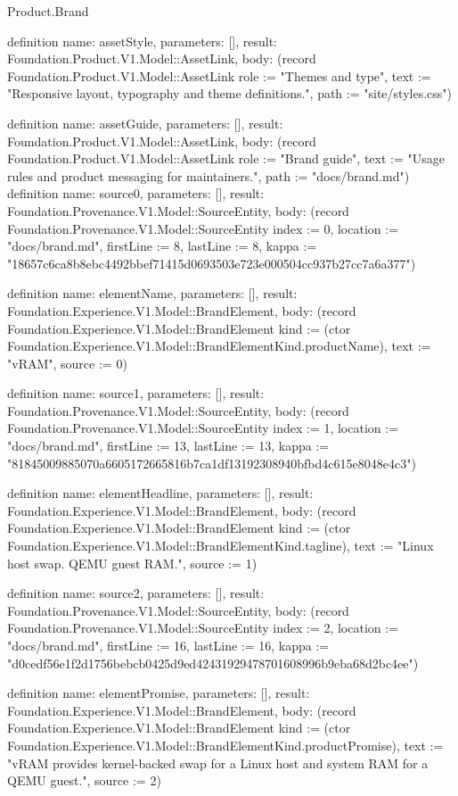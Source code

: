 \begin{lexlean}{Product.Brand}
\begin{semanticmodule}
definition{
  name: assetStyle, parameters: [], result: Foundation.Product.V1.Model::AssetLink,
  body: (record Foundation.Product.V1.Model::AssetLink {role := "Themes and type", text := "Responsive layout, typography and theme definitions.", path := "site/styles.css"})
}

definition{
  name: assetGuide, parameters: [], result: Foundation.Product.V1.Model::AssetLink,
  body: (record Foundation.Product.V1.Model::AssetLink {role := "Brand guide", text := "Usage rules and product messaging for maintainers.", path := "docs/brand.md"})
}
definition{
  name: source0, parameters: [], result: Foundation.Provenance.V1.Model::SourceEntity,
  body: (record Foundation.Provenance.V1.Model::SourceEntity {index := 0, location := "docs/brand.md", firstLine := 8, lastLine := 8, kappa := "18657c6ca8b8ebc4492bbef71415d0693503e723e000504cc937b27cc7a6a377"})
}

definition{
  name: elementName, parameters: [], result: Foundation.Experience.V1.Model::BrandElement,
  body: (record Foundation.Experience.V1.Model::BrandElement {kind := (ctor Foundation.Experience.V1.Model::BrandElementKind.productName), text := "vRAM", source := 0})
}

definition{
  name: source1, parameters: [], result: Foundation.Provenance.V1.Model::SourceEntity,
  body: (record Foundation.Provenance.V1.Model::SourceEntity {index := 1, location := "docs/brand.md", firstLine := 13, lastLine := 13, kappa := "81845009885070a6605172665816b7ca1df13192308940bfbd4c615e8048e4c3"})
}

definition{
  name: elementHeadline, parameters: [], result: Foundation.Experience.V1.Model::BrandElement,
  body: (record Foundation.Experience.V1.Model::BrandElement {kind := (ctor Foundation.Experience.V1.Model::BrandElementKind.tagline), text := "Linux host swap. QEMU guest RAM.", source := 1})
}

definition{
  name: source2, parameters: [], result: Foundation.Provenance.V1.Model::SourceEntity,
  body: (record Foundation.Provenance.V1.Model::SourceEntity {index := 2, location := "docs/brand.md", firstLine := 16, lastLine := 16, kappa := "d0cedf56e1f2d1756bebcb0425d9ed42431929478701608996b9eba68d2bc4ee"})
}

definition{
  name: elementPromise, parameters: [], result: Foundation.Experience.V1.Model::BrandElement,
  body: (record Foundation.Experience.V1.Model::BrandElement {kind := (ctor Foundation.Experience.V1.Model::BrandElementKind.productPromise), text := "vRAM provides kernel-backed swap for a Linux host and system RAM for a QEMU guest.", source := 2})
}


\end{semanticmodule}
\end{lexlean}
